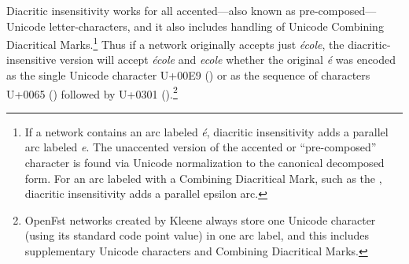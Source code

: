 \vspace{0.5cm}

Diacritic insensitivity works for all accented---also known as
pre-composed---Unicode letter-characters, and it also includes
handling of Unicode Combining Diacritical Marks.\footnote{If a network
contains an arc labeled \emph{\'e}, diacritic insensitivity adds a
parallel arc labeled \emph{e}.  The unaccented version of the accented or
``pre-composed'' character is found via Unicode normalization to the
canonical decomposed  form.  For an arc labeled with a
Combining Diacritical Mark, such as the ,
diacritic insensitivity adds a parallel epsilon arc.}  Thus if a network
originally accepts just \emph{\'ecole}, the diacritic-insensitive version
will accept \emph{\'ecole} and \emph{ecole} whether the original
\emph{\'e} was encoded as the single Unicode character U+00E9
() or as the sequence of characters
U+0065 () followed by U+0301 ().\footnote{OpenFst networks created by Kleene always store
one Unicode character (using its standard code point value) in one arc
label, and this includes supplementary Unicode characters and Combining
Diacritical Marks.}


